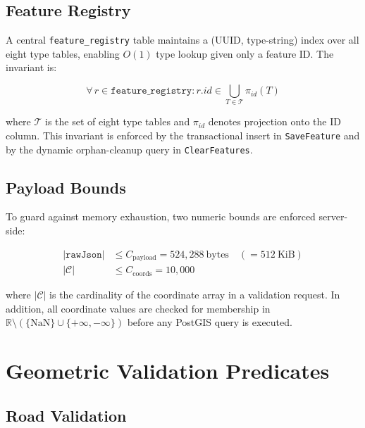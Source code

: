 \documentclass[12pt,a4paper]{article}
\theoremstyle{definition}
\theoremstyle{plain}
\theoremstyle{remark}
\newcommand{\R}{\mathbb{R}}
\newcommand{\abs}[1]{\left\lvert #1 \right\rvert}
\begin{document}
\subsection{Feature Registry}

A central \texttt{feature\_registry} table maintains a
(UUID, type-string) index over all eight type tables, enabling
$O(1)$ type lookup given only a feature ID. The invariant is:

\begin{equation}
  \forall\, r \in \texttt{feature\_registry}: r.\mathit{id} \in
  \bigcup_{T \in \mathcal{T}} \pi_{\mathit{id}}(T)
  \label{eq:registry_invariant}
\end{equation}

where $\mathcal{T}$ is the set of eight type tables and $\pi_{\mathit{id}}$
denotes projection onto the ID column. This invariant is enforced by the
transactional insert in \texttt{SaveFeature} and by the dynamic
orphan-cleanup query in \texttt{ClearFeatures}.

\subsection{Payload Bounds}

To guard against memory exhaustion, two numeric bounds are enforced
server-side:

\begin{align}
  \abs{\texttt{rawJson}} &\leq C_{\text{payload}} = 524{,}288\ \text{bytes} \quad
  (= 512\ \text{KiB})
  \label{eq:payload_bound} \\
  \abs{\mathcal{C}} &\leq C_{\text{coords}} = 10{,}000
  \label{eq:coord_bound}
\end{align}

where $\abs{\mathcal{C}}$ is the cardinality of the coordinate array in a
validation request. In addition, all coordinate values are checked for
membership in $\R \setminus (\{\mathrm{NaN}\} \cup \{+\infty, -\infty\})$
before any PostGIS query is executed.

\section{Geometric Validation Predicates}
\label{sec:validation}

\subsection{Road Validation}
\label{sec:road_validation}
\end{document}

